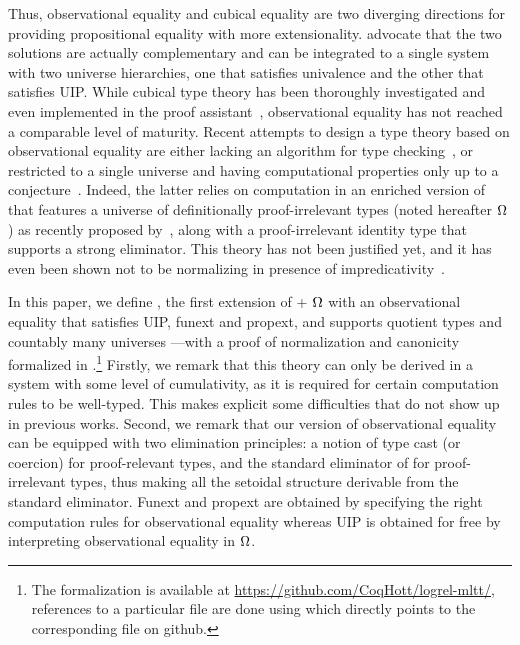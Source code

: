 Thus, observational equality and cubical equality are two diverging
directions for providing propositional equality with more extensionality.
 advocate that the
two solutions are actually complementary and can be integrated to
a single system with two universe hierarchies, one that satisfies
univalence and the other that satisfies UIP.
%
While cubical type theory has been thoroughly investigated and even
implemented in the \Agda proof assistant~,
observational equality has not reached a comparable level of maturity.
%
Recent attempts to design a type theory based on observational equality
are either lacking an algorithm for type checking~, or restricted to a single
universe and having computational properties only up to a
conjecture~. Indeed, the latter relies on computation
in an enriched version of \MLTT that features a universe of definitionally
proof-irrelevant types (noted hereafter $\Omega$) as recently proposed
by~, along with a proof-irrelevant identity type
that supports a strong eliminator. This theory has not been justified yet,
and it has even been shown not to be normalizing in presence of
impredicativity~.

In this paper, we define \SetoidTT, the first extension of \MLTT +
$\Omega$ with an observational equality that satisfies UIP, funext
and propext, and supports quotient types and countably many universes
---with a proof of normalization and canonicity formalized in \Agda.\footnote{The formalization is available at
  \url{https://github.com/CoqHott/logrel-mltt/}, references to a
  particular file are done using  which
  directly points to the corresponding file on github.}
%
Firstly, we remark that this theory can only be derived in a system with
some level of cumulativity, as it is required for certain
computation rules to be well-typed. This makes explicit some difficulties
that do not show up in previous works.
%
Second, we remark that our version of observational equality can be equipped
with two elimination principles: a notion of type cast (or coercion) for
proof-relevant types, and the standard eliminator of \MLTT for
proof-irrelevant types, thus making all the setoidal structure
derivable from the standard eliminator.
%
Funext and propext are obtained by specifying the right
computation rules for observational equality whereas UIP is obtained
for free by interpreting observational equality in $\Omega$.

